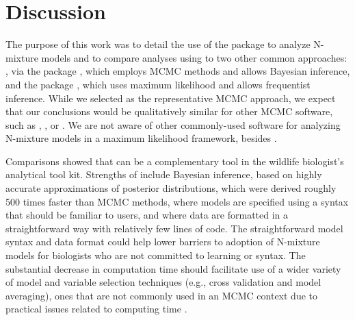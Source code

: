 \documentclass[codesnippet]{jss}
\begin{document}
\section[Discussion]{Discussion}
The purpose of this work was to detail the use of the  package \citep{Rue_Riebler_Sorbye_Illian_Simpson_Lindgren_2017} to analyze N-mixture models and to compare analyses using  to two other common approaches:  \citep{plummer2003jags,Lunn_Jackson_Best_Thomas_Spiegelhalter_2012}, via the  package \citep{Denwood_2016}, which employs MCMC methods and allows Bayesian inference, and the  package \citep{Fiske_Chandler_2011}, which uses maximum likelihood and allows frequentist inference. While we selected  as the representative MCMC approach, we expect that our conclusions would be qualitatively similar for other MCMC software, such as , , or . We are not aware of other commonly-used software for analyzing N-mixture models in a maximum likelihood framework, besides .

Comparisons showed that  can be a complementary tool in the 
wildlife biologist's analytical tool kit. Strengths of  include 
Bayesian inference, based on highly accurate approximations of posterior 
distributions, which were derived roughly 500 times faster than MCMC 
methods, where models are specified using a syntax that should be familiar 
to  users, and where data are formatted in a straightforward way 
with 
relatively few lines of code. The straightforward model syntax and data 
format could help lower  barriers to adoption of N-mixture models for 
biologists who are not committed to learning   or 
 syntax. The substantial decrease in computation time should 
facilitate use of a wider variety of model and variable selection techniques 
(e.g., cross validation and model averaging), ones that are not commonly 
used in an MCMC context due to practical issues related to computing time 
\citep{Kery_Schaub_2011}.
\end{document}
